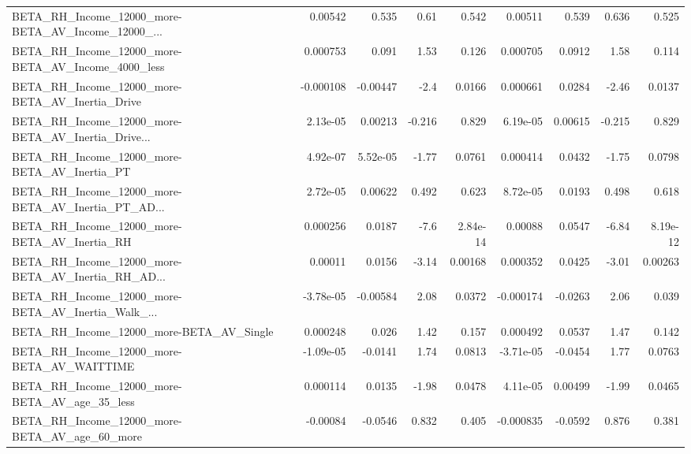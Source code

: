 \begin{tabular}{lrrrrrrrr}
BETA\_RH\_Income\_12000\_more-BETA\_AV\_Income\_12000\_... &     0.00542 &        0.535 &     0.61 &    0.542 &    0.00511 &       0.539 &        0.636 &         0.525 \\
BETA\_RH\_Income\_12000\_more-BETA\_AV\_Income\_4000\_less &    0.000753 &        0.091 &     1.53 &    0.126 &   0.000705 &      0.0912 &         1.58 &         0.114 \\
BETA\_RH\_Income\_12000\_more-BETA\_AV\_Inertia\_Drive    &   -0.000108 &     -0.00447 &     -2.4 &   0.0166 &   0.000661 &      0.0284 &        -2.46 &        0.0137 \\
BETA\_RH\_Income\_12000\_more-BETA\_AV\_Inertia\_Drive... &    2.13e-05 &      0.00213 &   -0.216 &    0.829 &   6.19e-05 &     0.00615 &       -0.215 &         0.829 \\
BETA\_RH\_Income\_12000\_more-BETA\_AV\_Inertia\_PT       &    4.92e-07 &     5.52e-05 &    -1.77 &   0.0761 &   0.000414 &      0.0432 &        -1.75 &        0.0798 \\
BETA\_RH\_Income\_12000\_more-BETA\_AV\_Inertia\_PT\_AD... &    2.72e-05 &      0.00622 &    0.492 &    0.623 &   8.72e-05 &      0.0193 &        0.498 &         0.618 \\
BETA\_RH\_Income\_12000\_more-BETA\_AV\_Inertia\_RH       &    0.000256 &       0.0187 &     -7.6 & 2.84e-14 &    0.00088 &      0.0547 &        -6.84 &      8.19e-12 \\
BETA\_RH\_Income\_12000\_more-BETA\_AV\_Inertia\_RH\_AD... &     0.00011 &       0.0156 &    -3.14 &  0.00168 &   0.000352 &      0.0425 &        -3.01 &       0.00263 \\
BETA\_RH\_Income\_12000\_more-BETA\_AV\_Inertia\_Walk\_... &   -3.78e-05 &     -0.00584 &     2.08 &   0.0372 &  -0.000174 &     -0.0263 &         2.06 &         0.039 \\
BETA\_RH\_Income\_12000\_more-BETA\_AV\_Single           &    0.000248 &        0.026 &     1.42 &    0.157 &   0.000492 &      0.0537 &         1.47 &         0.142 \\
BETA\_RH\_Income\_12000\_more-BETA\_AV\_WAITTIME         &   -1.09e-05 &      -0.0141 &     1.74 &   0.0813 &  -3.71e-05 &     -0.0454 &         1.77 &        0.0763 \\
BETA\_RH\_Income\_12000\_more-BETA\_AV\_age\_35\_less      &    0.000114 &       0.0135 &    -1.98 &   0.0478 &   4.11e-05 &     0.00499 &        -1.99 &        0.0465 \\
BETA\_RH\_Income\_12000\_more-BETA\_AV\_age\_60\_more      &    -0.00084 &      -0.0546 &    0.832 &    0.405 &  -0.000835 &     -0.0592 &        0.876 &         0.381 \\

\end{tabular}
